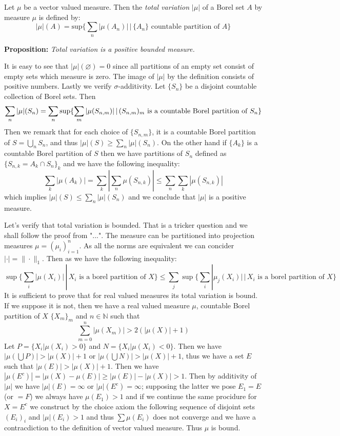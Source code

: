 \documentclass{article}
\begin{document}
\vspace{1ex} Let $\mu$ be a vector valued measure. Then the \emph{total
variation} $|\mu|$ of a Borel set $A$  by measure $\mu$ is defined by:
\[|\mu|(A) = \text{sup}\{\sum_n|\mu(A_n)|\,|\,\{A_n\}\text{ countable partition of }A\}\]

\textbf{Proposition:} \textit{Total variation is a positive bounded measure.}

\vspace{1ex}
It is easy to see that $|\mu|(\varnothing)=0$ since all partitions of an empty
set consist of empty sets which measure is zero. The image of $|\mu|$ by the
definition consists of positive numbers. Lastly we verify $\sigma$-additivity.
Let $\{S_n\}$ be a disjoint countable collection of Borel sets. Then
\[ 
    \sum_n|\mu|(S_n) = \sum_n\sup\{\sum_m|\mu(S_{n,m})|\,|\,(S_{n,m})_m\text{ is a countable Borel partition of }S_n\} \\ 
\]
Then we remark that for each choice of $\{S_{n,m}\}$, it is a countable Borel
partition of $S=\bigcup_n S_n$, and thus $|\mu|(S)\geq\sum_n|\mu|(S_n)$. On the
other hand if $\{A_k\}$ is a countable Borel partition of $S$ then we have
partitions of $S_n$ defined as $\{S_{n,k}=A_k\cap S_n\}_k$ and we have the
following inequality:
\[
    \sum_k|\mu(A_k)|=\sum_k|\sum_n\mu(S_{n,k})|\leq\sum_n\sum_k|\mu(S_{n,k})|
\]
which implies $|\mu|(S)\leq\sum_n|\mu|(S_n)$ and we conclude that $|\mu|$ is a
positive measure.

\vspace{1ex}
Let's verify that total variation is bounded.
That is a tricker question and we
shall follow the proof from "...". The measure can be partitioned into projection measures
$\mu=(\mu_i)_{i=1}^n$. As all the norms are equivalent we can concider $|\cdot|
= \|\cdot\|_1$. Then as we have the following inequality:
\[\sup\{\sum_i|\mu(X_i)|\,|\,X_i\text{ is a borel partition of }X\} \leq \sum_j\sup\{\sum_i|\mu_j(X_i)|\,|\,X_i\text{ is a borel partition of }X\}\]
It is sufficient to prove that for real valued measures its total variation is bound.
If we suppose it is not, then we have a real valued measure $\mu$,
countable Borel partition of $X$ $\{X_m\}_m$ and $n\in\mathbb{N}$ such that
\[\sum_{m=0}^n|\mu(X_m)|>2(|\mu(X)|+1)\]
Let $P=\{X_i|\mu(X_i)>0\}$ and $N=\{X_i|\mu(X_i)<0\}$. Then
we have $|\mu(\bigcup P)|>|\mu(X)|+1$ or $|\mu(\bigcup N)|>|\mu(X)|+1$, thus we
have a set $E$ such that $|\mu(E)|>|\mu(X)|+1$. Then we have $|\mu(E^c)|=|\mu(X)
-\mu(E)|\geq |\mu(E)|-|\mu(X)|>1$. Then by additivity of $|\mu|$ we have
$|\mu|(E)=\infty$ or $|\mu|(E^c)=\infty$; supposing the latter we pose $E_1=E$
(or $=F$) we always have $\mu(E_1)>1$ and if we continue the same procidure for
$X=E^c$ we construct by the choice axiom the following sequence of disjoint sets
$(E_i)_i$ and $|\mu|(E_i)>1$ and thus $\sum\mu(E_i)$ does not converge and we
have a contracdiction to the definition of vector valued measure. Thus $\mu$
is bound.
\end{document}
